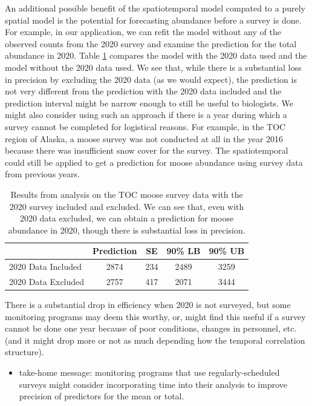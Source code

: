 \documentclass[]{interact}
\theoremstyle{plain}%
\theoremstyle{definition}
\theoremstyle{remark}
\providecommand{\tightlist}{%
  \setlength{\itemsep}{0pt}\setlength{\parskip}{0pt}}
\def\tightlist{}
\begin{document}
An additional possible benefit of the spatiotemporal model compated to a
purely spatial model is the potential for forecasting abundance before a
survey is done. For example, in our application, we can refit the model
without any of the observed counts from the 2020 survey and examine the
prediction for the total abundance in 2020. Table \ref{tab:forecast}
compares the model with the 2020 data used and the model without the
2020 data used. We see that, while there is a substantial loss in
precision by excluding the 2020 data (as we would expect), the
prediction is not very different from the prediction with the 2020 data
included and the prediction interval might be narrow enough to still be
useful to biologists. We might also consider using such an approach if
there is a year during which a survey cannot be completed for logistical
reasons. For example, in the TOC region of Alaska, a moose survey was
not conducted at all in the year 2016 because there was insufficient
snow cover for the survey. The spatiotemporal could still be applied to
get a prediction for moose abundance using survey data from previous
years.

\begin{table}[H]

\caption{\label{tab:forecast}Results from analysis on the TOC moose survey data with the 2020 survey included and excluded. We can see that, even with 2020 data excluded, we can obtain a prediction for moose abundance in 2020, though there is substantial loss in precision.}
\centering
\begin{tabular}[t]{lcccc}
\toprule
  & Prediction & SE & 90\% LB & 90\% UB\\
\midrule
2020 Data Included & 2874 & 234 & 2489 & 3259\\
2020 Data Excluded & 2757 & 417 & 2071 & 3444\\
\bottomrule
\end{tabular}
\end{table}

There is a substantial drop in efficiency when 2020 is not surveyed, but
some monitoring programs may deem this worthy, or, might find this
useful if a survey cannot be done one year because of poor conditions,
changes in personnel, etc. (and it might drop more or not as much
depending how the temporal correlation structure).

\begin{itemize}
\tightlist
\item
  take-home message: monitoring programs that use regularly-scheduled
  surveys might consider incorporating time into their analysis to
  improve precision of predictors for the mean or total.
\end{itemize}
\end{document}
